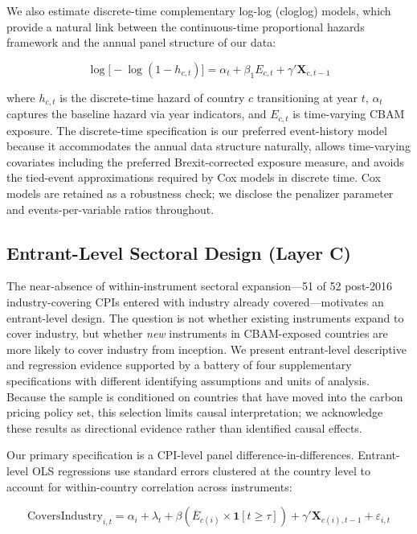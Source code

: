 \documentclass[12pt,a4paper]{article}
\begin{document}
We also estimate discrete-time complementary log-log (cloglog) models, which provide a natural link between the continuous-time proportional hazards framework and the annual panel structure of our data:

\begin{equation}
\log\!\bigl[-\log(1 - h_{c,t})\bigr] = \alpha_t + \beta_1 E_{c,t} + \gamma' \mathbf{X}_{c,t-1}
\label{eq:cloglog}
\end{equation}

\noindent where $h_{c,t}$ is the discrete-time hazard of country $c$ transitioning at year $t$, $\alpha_t$ captures the baseline hazard via year indicators, and $E_{c,t}$ is time-varying CBAM exposure. The discrete-time specification is our preferred event-history model because it accommodates the annual data structure naturally, allows time-varying covariates including the preferred Brexit-corrected exposure measure, and avoids the tied-event approximations required by Cox models in discrete time. Cox models are retained as a robustness check; we disclose the penalizer parameter and events-per-variable ratios throughout.

\subsection{Entrant-Level Sectoral Design (Layer C)}\label{sec:entrant_spec}

The near-absence of within-instrument sectoral expansion---51 of 52 post-2016 industry-covering CPIs entered with industry already covered---motivates an entrant-level design. The question is not whether existing instruments expand to cover industry, but whether \textit{new} instruments in CBAM-exposed countries are more likely to cover industry from inception. We present entrant-level descriptive and regression evidence supported by a battery of four supplementary specifications with different identifying assumptions and units of analysis. Because the sample is conditioned on countries that have moved into the carbon pricing policy set, this selection limits causal interpretation; we acknowledge these results as directional evidence rather than identified causal effects.

Our primary specification is a CPI-level panel difference-in-differences. Entrant-level OLS regressions use standard errors clustered at the country level to account for within-country correlation across instruments:

\begin{equation}
\text{CoversIndustry}_{i,t} = \alpha_i + \lambda_t + \beta \left( \overline{E}_{c(i)} \times \mathbf{1}[t \geq \tau] \right) + \gamma' \mathbf{X}_{c(i),t-1} + \varepsilon_{i,t}
\label{eq:panel_did}
\end{equation}
\end{document}
